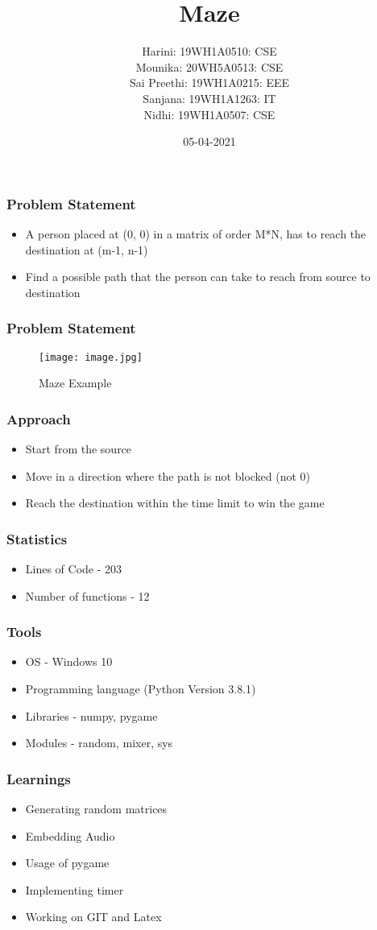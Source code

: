 \documentclass[14pt]{beamer}
\title{Maze}
\date{05-04-2021}
\author[Bvrith]{Harini: 19WH1A0510: CSE \\ Mounika: 20WH5A0513: CSE \\ Sai Preethi: 19WH1A0215: EEE  \\ Sanjana: 19WH1A1263: IT \\  Nidhi: 19WH1A0507: CSE }
\institute{\normalsize{\color{blendedblue}{BVRIT HYDERABAD College of Engineering for Women}}}
\begin{document}
    \begin{frame}
        \titlepage
    \end{frame}
    \begin{frame}
	\frametitle{Problem Statement}
        \begin{itemize}
	    \item A person placed at (0, 0) in a matrix of order M*N, has to reach the destination at (m-1, n-1)
	    \item Find a possible path that the person can take to reach from source to destination
	\end{itemize}
    \end{frame}
    \begin{frame}
	    \frametitle{Problem Statement}
	    \begin{figure}[htp]
                        \centering
                         \texttt{[image: image.jpg]}
			 \caption{Maze Example}
                 \end{figure}
    \end{frame}
    \begin{frame}
	\frametitle{Approach}
	\begin{itemize}
		\item Start from the source 
		\item Move in a direction where the path is not blocked (not 0)
		\item Reach the destination within the time limit to win the game
	\end{itemize}
    \end{frame}
    \begin{frame}
	\frametitle{Statistics}
	\begin{itemize}
		\item Lines of Code - 203
		\item Number of functions - 12
	\end{itemize}
    \end{frame}
    \begin{frame}
	\frametitle{Tools}
	\begin{itemize}
		\item OS - Windows 10
		\item Programming language (Python Version 3.8.1)
		\item Libraries - numpy, pygame
		\item Modules - random, mixer, sys
	\end{itemize}
    \end{frame}
    \begin{frame}
        \frametitle{Learnings}
	\begin{itemize}
	    \item Generating random matrices
	    \item Embedding Audio 
	    \item Usage of pygame
	    \item Implementing timer
	    \item Working on GIT and Latex
	\end{itemize}
    \end{frame}
\end{document}
